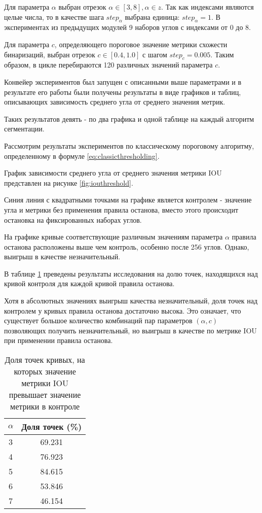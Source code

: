 Для параметра \(\alpha\) выбран отрезок \(\alpha \in [3, 8], \alpha \in z\). Так как индексами являются целые числа, то в качестве шага \(step_{\alpha}\) выбрана единица: \(step_{\alpha} = 1\). В экспериментах из предыдущих модулей 9 наборов углов с индексами от 0 до 8.

Для параметра \(c\), определяющего пороговое значение метрики схожести бинаризаций, выбран отрезок \(c \in [0.4, 1.0]\) с шагом \(step_c = 0.005\). Таким образом, в цикле перебираются 120 различных значений параметра \(c\).

Конвейер экспериментов был запущен с описанными выше параметрами и в результате его работы были получены результаты в виде графиков и таблиц, описывающих зависимость среднего угла от среднего значения метрик. 

Таких результатов девять - по  два графика и одной таблице на каждый алгоритм сегментации.

Рассмотрим результаты экспериментов по классическому пороговому алгоритму, определенному в формуле \ref*{eq:classicthresholding}.

График зависимости среднего угла от среднего значения метрики IOU представлен на рисунке \ref*{fig:iouthreshold}.


Синия линия с квадратными точками на графике является контролем - значение угла и метрики без применения правила останова, вместо этого происходит остановка на фиксированных наборах углов.

На графике кривые соответствующие различным значениям параметра \(\alpha\) правила останова расположены выше чем контроль, особенно после 256 углов. Однако, выигрыш в качестве незначительный.

В таблице \ref*{tab:thresholdingiou} преведены результаты исследования на долю точек, находящихся над кривой контроля для каждой кривой правила останова.

Хотя в абсолютных значениях выигрыш качества незначительный, доля точек над контролем у кривых правила останова достаточно высока. Это означает, что существует большое количество комбинаций пар параметров \((\alpha, c)\) позволяющих получить незначительный, но выигрыш в качестве по метрике IOU при применении правила останова. 

\begin{table}[H]
\centering
\caption{Доля точек кривых, на которых значение метрики IOU превышает значение метрики в  контроле}
\label{tab:thresholdingiou}
\begin{tabular}{|c|c|}
\hline
\(\alpha\) & Доля точек (\%) \\
\hline
3 & 69.231 \\
4 & 76.923 \\
5 & 84.615 \\
6 & 53.846 \\
7 & 46.154 \\
\hline
\end{tabular}
\end{table}

